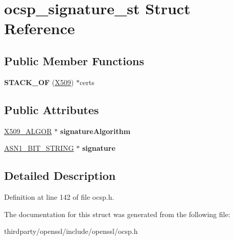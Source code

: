 \hypertarget{structocsp__signature__st}{}\section{ocsp\+\_\+signature\+\_\+st Struct Reference}
\label{structocsp__signature__st}
\subsection*{Public Member Functions}
\begin{DoxyCompactItemize}
\item 
\mbox{\label{structocsp__signature__st_ae225db22e12419cbd84658e70d3a96e5}} 
{\bfseries S\+T\+A\+C\+K\+\_\+\+OF} (\hyperlink{structx509__st}{X509}) $\ast$certs
\end{DoxyCompactItemize}
\subsection*{Public Attributes}
\begin{DoxyCompactItemize}
\item 
\mbox{\label{structocsp__signature__st_a6c7ac15576a2cbfeae06fd4d1134d324}} 
\hyperlink{struct_x509__algor__st}{X509\+\_\+\+A\+L\+G\+OR} $\ast$ {\bfseries signature\+Algorithm}
\item 
\mbox{\label{structocsp__signature__st_a56ff8ee97dc7551d6b0d5981a183135e}} 
\hyperlink{structasn1__string__st}{A\+S\+N1\+\_\+\+B\+I\+T\+\_\+\+S\+T\+R\+I\+NG} $\ast$ {\bfseries signature}
\end{DoxyCompactItemize}


\subsection{Detailed Description}


Definition at line 142 of file ocsp.\+h.



The documentation for this struct was generated from the following file\+:\begin{DoxyCompactItemize}
\item 
thirdparty/openssl/include/openssl/ocsp.\+h\end{DoxyCompactItemize}
